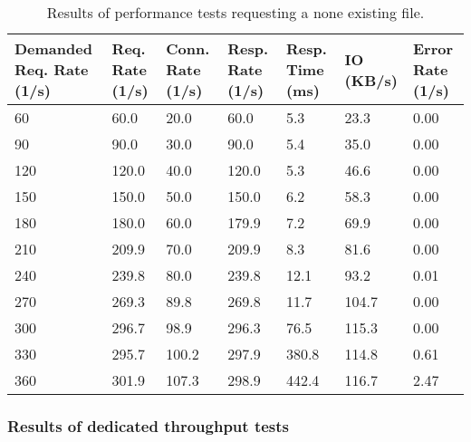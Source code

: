 \begin{table}[H]
  \centering
    \begin{tabular}{|m{2.5cm}|m{2cm}|m{2cm}|m{2cm}|m{2cm}|m{2cm}|m{2cm}|}
    \hline
    \textbf{Demanded Req. Rate} (1/s) & \textbf{Req. Rate} (1/s) & \textbf{Conn. Rate} (1/s) & \textbf{Resp. Rate} (1/s) & \textbf{Resp. Time} (ms) & \textbf{IO} (KB/s) & \textbf{Error Rate} (1/s) \\
    \hline
    60 & 60.0 & 20.0 & 60.0 & 5.3 & 23.3 & 0.00 \\
    90 & 90.0 & 30.0 & 90.0 & 5.4 & 35.0 & 0.00 \\
    120 & 120.0 & 40.0 & 120.0 & 5.3 & 46.6 & 0.00 \\
    150 & 150.0 & 50.0 & 150.0 & 6.2 & 58.3 & 0.00 \\
    180 & 180.0 & 60.0 & 179.9 & 7.2 & 69.9 & 0.00 \\
    210 & 209.9 & 70.0 & 209.9 & 8.3 & 81.6 & 0.00 \\
    240 & 239.8 & 80.0 & 239.8 & 12.1 & 93.2 & 0.01 \\
    270 & 269.3 & 89.8 & 269.8 & 11.7 & 104.7 & 0.00 \\
    300 & 296.7 & 98.9 & 296.3 & 76.5 & 115.3 & 0.00 \\
    330 & 295.7 & 100.2 & 297.9 & 380.8 & 114.8 & 0.61 \\
    360 & 301.9 & 107.3 & 298.9 & 442.4 & 116.7 & 2.47 \\
    \hline
    \end{tabular}
  \caption{Results of performance tests requesting a none existing file.}
  \label{tab:perf-res-404}
\end{table}
\hspace{2cm}

\subsubsection{Results of dedicated throughput tests}


